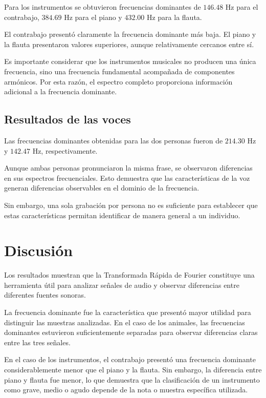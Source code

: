 \documentclass[conference]{IEEEtran}
\begin{document}
Para los instrumentos se obtuvieron frecuencias dominantes de $146.48$ Hz para el contrabajo, $384.69$ Hz para el piano y $432.00$ Hz para la flauta.

El contrabajo presentó claramente la frecuencia dominante más baja. El piano y la flauta presentaron valores superiores, aunque relativamente cercanos entre sí.

Es importante considerar que los instrumentos musicales no producen una única frecuencia, sino una frecuencia fundamental acompañada de componentes armónicos. Por esta razón, el espectro completo proporciona información adicional a la frecuencia dominante.


\subsection{Resultados de las voces}

Las frecuencias dominantes obtenidas para las dos personas fueron de $214.30$ Hz y $142.47$ Hz, respectivamente.

Aunque ambas personas pronunciaron la misma frase, se observaron diferencias en sus espectros frecuenciales. Esto demuestra que las características de la voz generan diferencias observables en el dominio de la frecuencia.

Sin embargo, una sola grabación por persona no es suficiente para establecer que estas características permitan identificar de manera general a un individuo.



\section{Discusión}

Los resultados muestran que la Transformada Rápida de Fourier constituye una herramienta útil para analizar señales de audio y observar diferencias entre diferentes fuentes sonoras.

La frecuencia dominante fue la característica que presentó mayor utilidad para distinguir las muestras analizadas. En el caso de los animales, las frecuencias dominantes estuvieron suficientemente separadas para observar diferencias claras entre las tres señales.

En el caso de los instrumentos, el contrabajo presentó una frecuencia dominante considerablemente menor que el piano y la flauta. Sin embargo, la diferencia entre piano y flauta fue menor, lo que demuestra que la clasificación de un instrumento como grave, medio o agudo depende de la nota o muestra específica utilizada.
\end{document}
